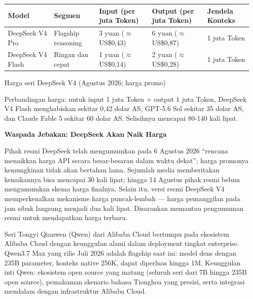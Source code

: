 \begin{center}
\begin{tabularx}{\linewidth}{|X|X|X|X|X|}
\hline
\textbf{Model} & \textbf{Segmen} & \textbf{Input (per juta Token)} & \textbf{Output (per juta Token)} & \textbf{Jendela Konteks} \tabularnewline
\hline
DeepSeek V4 Pro & Flagship reasoning & 3 yuan ($\approx$US\$0,43) & 6 yuan ($\approx$US\$0,87) & 1 juta Token \tabularnewline
DeepSeek V4 Flash & Ringan dan cepat & 1 yuan ($\approx$US\$0,14) & 2 yuan ($\approx$US\$0,28) & 1 juta Token \tabularnewline
\hline
\end{tabularx}
\end{center}

\begin{center}\small\color{gray}Harga seri DeepSeek V4 (Agustus 2026; harga promo)\end{center}

Perbandingan harga: untuk input 1 juta Token + output 1 juta Token, DeepSeek V4 Flash menghabiskan sekitar 0,42 dolar AS, GPT-5.6 Sol sekitar 35 dolar AS, dan Claude Fable 5 sekitar 60 dolar AS. Selisihnya mencapai 80-140 kali lipat.

\textbf{Waspada Jebakan: DeepSeek Akan Naik Harga}\par

Pihak resmi DeepSeek telah mengumumkan pada 6 Agustus 2026 “rencana menaikkan harga API secara besar-besaran dalam waktu dekat”; harga promonya kemungkinan tidak akan bertahan lama. Sejumlah media memberitakan kenaikannya bisa mencapai 30 kali lipat; hingga 14 Agustus pihak resmi belum mengumumkan skema harga finalnya. Selain itu, versi resmi DeepSeek V4 memperkenalkan mekanisme harga puncak-lembah — harga pemanggilan pada jam sibuk langsung menjadi dua kali lipat. Disarankan memantau pengumuman resmi untuk mendapatkan harga terbaru.


Seri Tongyi Qianwen (Qwen) dari Alibaba Cloud bertumpu pada ekosistem Alibaba Cloud dengan keunggulan alami dalam deployment tingkat enterprise. Qwen3.7 Max yang rilis Juli 2026 adalah flagship saat ini: model dens dengan 235B parameter, konteks native 256K, dapat diperluas hingga 1M. Keunggulan inti Qwen: ekosistem open source yang matang (seluruh seri dari 7B hingga 235B open source), pemahaman skenario bahasa Tionghoa yang presisi, serta integrasi mendalam dengan infrastruktur Alibaba Cloud.

